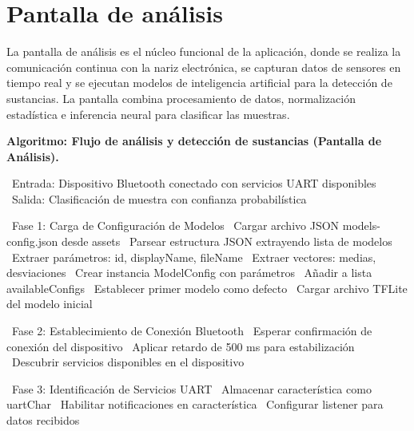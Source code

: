 \section{Pantalla de análisis}

La pantalla de análisis es el núcleo funcional de la aplicación, donde se realiza la comunicación continua con la nariz electrónica, se capturan datos de sensores en tiempo real y se ejecutan modelos de inteligencia artificial para la detección de sustancias. La pantalla combina procesamiento de datos, normalización estadística e inferencia neural para clasificar las muestras.
\par

\noindent\textbf{Algoritmo: Flujo de análisis y detección de sustancias (Pantalla de Análisis).}

\begin{algorithmic}[1]
\State~Entrada: Dispositivo Bluetooth conectado con servicios UART disponibles
\State~Salida: Clasificación de muestra con confianza probabilística

\State~Fase 1: Carga de Configuración de Modelos
\State~Cargar archivo JSON models-config.json desde assets
\State~Parsear estructura JSON extrayendo lista de modelos
    \State~Extraer parámetros: id, displayName, fileName
    \State~Extraer vectores: medias, desviaciones
    \State~Crear instancia ModelConfig con parámetros
    \State~Añadir a lista availableConfigs
\EndFor%
    \State~Establecer primer modelo como defecto
    \State~Cargar archivo TFLite del modelo inicial
\EndIf%

\State~Fase 2: Establecimiento de Conexión Bluetooth
\State~Esperar confirmación de conexión del dispositivo
\State~Aplicar retardo de 500 ms para estabilización
\State~Descubrir servicios disponibles en el dispositivo

\State~Fase 3: Identificación de Servicios UART
                \State~Almacenar característica como uartChar
                \State~Habilitar notificaciones en característica
                \State~Configurar listener para datos recibidos
            \EndIf%
        \EndFor%
    \EndIf%
\EndFor%


\end{algorithmic}
